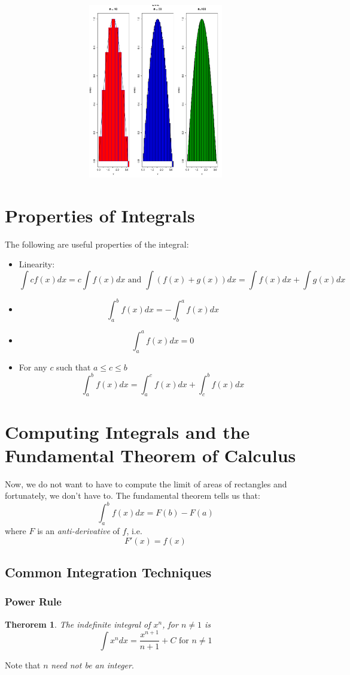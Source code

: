 \documentclass[12pt,a4paper]{article} %
\newtheorem{thm}{Therorem}
\begin{document}
\includegraphics[width = 6in, height=3in]{IntLimit.pdf}
\section{Properties of Integrals}
The following are useful properties of the integral:
\begin{itemize}
\item Linearity:
$$\int cf(x)dx = c\int f(x) dx \textrm{ and } \int(f(x)+g(x))dx = \int f(x)dx + \int g(x) dx$$
\item $$\int_a^b f(x) dx = -\int_b^a f(x) dx$$
\item $$ \int_a^a f(x) dx = 0$$
\item For any $c$ such that $a\leq c\leq b$
$$\int_a^bf(x)dx = \int_a^c f(x) dx + \int_c^b f(x) dx$$ 
\end{itemize}
\section{Computing Integrals and the Fundamental Theorem of Calculus}
Now, we do not want to have to compute the limit of areas of rectangles and fortunately, we don't have to. The fundamental theorem tells us that:
$$\int_a^b f(x) dx = F(b) - F(a)$$
where $F$ is an \emph{anti-derivative} of $f$, i.e.
$$F'(x) = f(x)$$
\subsection{Common Integration Techniques}
\subsubsection{Power Rule}
\begin{thm}
The indefinite integral of $x^n$, for $n\neq 1$ is
$$\int x^n dx = \frac{x^{n+1}}{n+1} + C\textrm{ for } n\neq 1$$ 
\end{thm} 
Note that $n$ \emph{need not be an integer}. 
\end{document}
